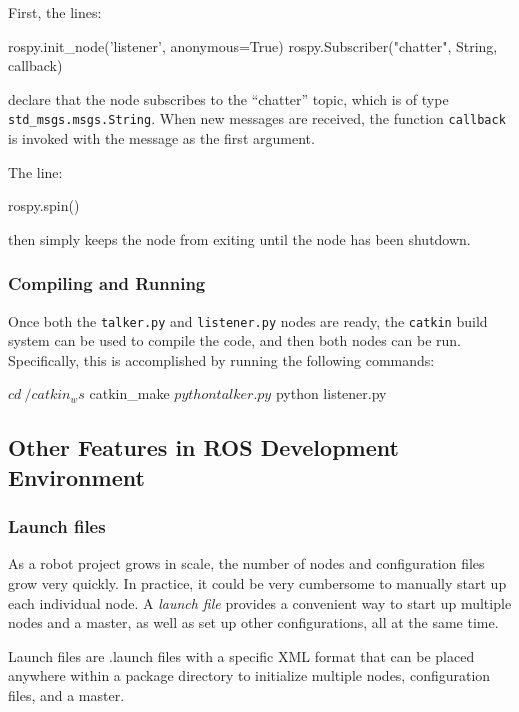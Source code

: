 \vspace{\baselineskip}
\noindent
First, the lines:
\begin{pythonnoborder}
    rospy.init_node('listener', anonymous=True)
    rospy.Subscriber("chatter", String, callback)
\end{pythonnoborder}
declare that the node subscribes to the ``chatter'' topic, which is of type \texttt{std\_msgs.msgs.String}. When new messages are received, the function \texttt{callback} is invoked with the message as the first argument.

\vspace{\baselineskip}
\noindent
The line:
\begin{pythonnoborder}
    rospy.spin()
\end{pythonnoborder}
then simply keeps the node from exiting until the node has been shutdown.

\subsubsection{Compiling and Running}
Once both the \texttt{talker.py} and \texttt{listener.py} nodes are ready, the \texttt{catkin} build system can be used to compile the code, and then both nodes can be run. Specifically, this is accomplished by running the following commands:
\begin{gencode}
$ cd ~/catkin_ws
$ catkin_make
$ python talker.py
$ python listener.py
\end{gencode}

\subsection{Other Features in ROS Development Environment }
\subsubsection{Launch files} 

As a robot project grows in scale, the number of nodes and configuration files grow very quickly. In practice, it could be very cumbersome to manually start up each individual node.
A \textit{launch file} provides a convenient way to start up multiple nodes and a master, as well as set up other configurations, all at the same time. 
\begin{definition}
Launch files are .launch files with a specific XML format that can be placed anywhere within a package directory to initialize multiple nodes, configuration files, and a master.
\end{definition}

